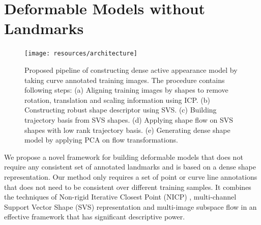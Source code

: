 \chapter{Deformable Models without Landmarks}



\begin{figure}[h]
    \centering
        \texttt{[image: resources/architecture]}
    \caption{Proposed pipeline of constructing dense active appearance model by taking curve annotated training images. The procedure contains following steps: (a) Aligning training images by shapes to remove rotation, translation and scaling information using ICP. (b) Constructing robust shape descriptor using SVS. (c) Building trajectory basis from SVS shapes. (d) Applying shape flow on SVS shapes with low rank trajectory basis. (e) Generating dense shape model by applying PCA on flow transformations.}
    \label{fig:archi}
\end{figure}

We propose a novel framework for building deformable models that does not require any consistent set of annotated landmarks and is based on a dense shape representation. Our method only requires a set of point or curve line annotations that does not need to be consistent over different training samples. It combines the techniques of Non-rigid Iterative Closest Point (NICP) \cite{Amberg2007}, multi-channel Support Vector Shape (SVS) \cite{Nguyen2013} representation and multi-image subspace flow in an effective framework that has significant descriptive power.

